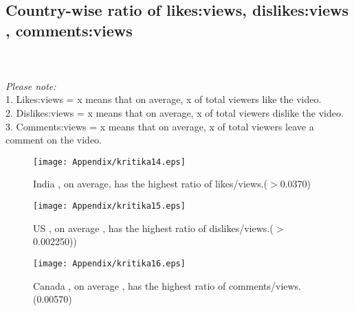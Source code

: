 \documentclass[runningheads]{llncs}
\begin{document}
\subsection{Country-wise ratio of likes:views, dislikes:views , comments:views }\\ \\
\textit{Please note:}\\
1. Likes:views = x means that on average, x of total viewers like the video.\\
2. Dislikes:views = x means that on average, x of total viewers dislike the video.\\
3. Comments:views = x means that on average, x of total viewers leave a comment on the video.
\begin{figure}[H]
\centering
\begin{minipage}{.5\textwidth}
  \centering
  \texttt{[image: Appendix/kritika14.eps]}
  \caption{India , on average, has the highest ratio of likes/views.($>$0.0370)}
\end{minipage}%
\begin{minipage}{.5\textwidth}
  \centering
  \texttt{[image: Appendix/kritika15.eps]}
  \caption{US , on average , has the highest ratio of dislikes/views.($>$0.002250))}
\end{minipage}
\end{figure}
\begin{figure}[H]
\centering
\begin{minipage}{.5\textwidth}
  \centering
  \texttt{[image: Appendix/kritika16.eps]}
  \caption{Canada , on average , has the highest ratio of comments/views.(0.00570)}
\end{minipage}%
\end{figure}
\end{document}
